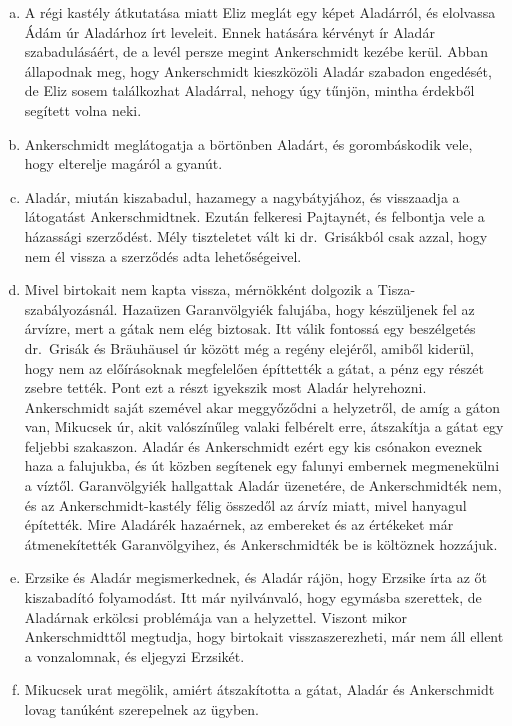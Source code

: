 \documentclass{thesis-ekf}
\theoremstyle{definition}
\begin{document}
    \begin{enumerate}[a)]
        \item\label{itm:Eliz-folyamodvany} A régi kastély átkutatása miatt Eliz meglát egy képet Aladárról,
            és elolvassa Ádám úr Aladárhoz írt leveleit.
        Ennek hatására kérvényt ír Aladár szabadulásáért, de a levél persze megint Ankerschmidt kezébe kerül.
        Abban állapodnak meg, hogy Ankerschmidt kieszközöli Aladár szabadon engedését, de Eliz sosem találkozhat Aladárral,
            nehogy úgy tűnjön, mintha érdekből segített volna neki.
        \item\label{itm:varborton} Ankerschmidt meglátogatja a börtönben Aladárt, és gorombáskodik vele, hogy elterelje magáról a gyanút.
        \item\label{itm:Aladar-hazaer} Aladár, miután kiszabadul, hazamegy a nagybátyjához, és visszaadja a látogatást Ankerschmidtnek.
        Ezután felkeresi Pajtaynét, és felbontja vele a házassági szerződést.
        Mély tiszteletet vált ki dr.~Grisákból csak azzal, hogy nem él vissza a szerződés adta lehetőségeivel.
        \item\label{itm:a-kozos-baj} Mivel birtokait nem kapta vissza, mérnökként dolgozik a Tisza-szabályozásnál.
        Hazaüzen Garanvölgyiék falujába, hogy készüljenek fel az árvízre, mert a gátak nem elég biztosak.
        Itt válik fontossá egy beszélgetés dr.~Grisák és Bräuhäusel úr között még a regény elejéről, amiből kiderül,
            hogy nem az előírásoknak megfelelően építtették a gátat, a pénz egy részét zsebre tették.
        Pont ezt a részt igyekszik most Aladár helyrehozni.
        Ankerschmidt saját szemével akar meggyőződni a helyzetről, de amíg a gáton van, Mikucsek úr, akit valószínűleg
            valaki felbérelt erre, átszakítja a gátat egy feljebbi szakaszon.
        Aladár és Ankerschmidt ezért egy kis csónakon eveznek haza a falujukba, és út közben segítenek egy falunyi embernek
            megmenekülni a víztől.
        Garanvölgyiék hallgattak Aladár üzenetére, de Ankerschmidték nem, és az Ankerschmidt-kastély félig összedől
            az árvíz miatt, mivel hanyagul építették.
        Mire Aladárék hazaérnek, az embereket és az értékeket már átmenekítették Garanvölgyihez, és Ankerschmidték
            be is költöznek hozzájuk.
        \item\label{itm:Aladar-es-Erzsike} Erzsike és Aladár megismerkednek, és Aladár rájön, hogy Erzsike írta az őt kiszabadító folyamodást.
        Itt már nyilvánvaló, hogy egymásba szerettek, de Aladárnak erkölcsi problémája van a helyzettel.
        Viszont mikor Ankerschmidttől megtudja, hogy birtokait visszaszerezheti, már nem áll ellent a vonzalomnak,
            és eljegyzi Erzsikét.
        \item\label{itm:per} Mikucsek urat megölik, amiért átszakította a gátat, Aladár és Ankerschmidt lovag tanúként szerepelnek az ügyben.
\end{enumerate}
\end{document}
